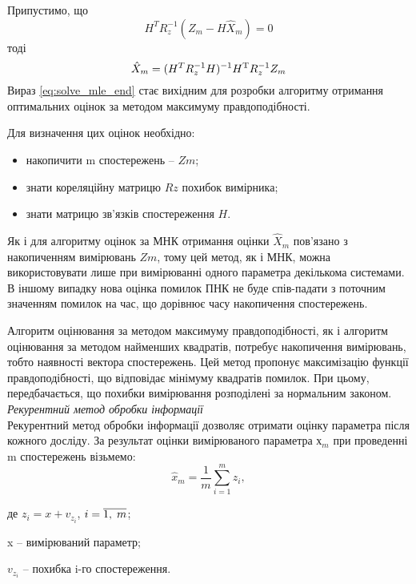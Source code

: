 Припустимо, що      
\[ H ^{T} R_{z}^{-1} (Z_{m} -H\hat{X}_{m} )=0 \]
тоді   
\begin{equation}
\hat{X }_{m} =(H^{T} R_{z}^{-1} H)^{-1} H^{{\rm T}} R_{z}^{-1} Z_{m} 
\label{eq:solve_mle_end}
\end{equation}
Вираз \eqref{eq:solve_mle_end} стає вихідним для розробки алгоритму отримання оптимальних 
оцінок  за методом максимуму правдоподібності.

Для визначення цих оцінок необхідно:
\begin{itemize}
\item накопичити m  спостережень -- $Zm$;
\item знати кореляційну матрицю $Rz$ похибок вимірника;
\item знати матрицю зв'язків спостереження $H$.
\end{itemize}

Як і для алгоритму оцінок за МНК отримання оцінки $\hat{X}_{m} $  пов'язано 
з накопиченням вимірювань $Zm$, тому цей метод, як і МНК, можна використовувати 
лише при вимірюванні одного параметра декількома системами. В іншому випадку нова 
оцінка помилок ПНК не буде спів-падати з поточним значенням помилок на час, що дорівнює 
часу накопичення спостережень.

Алгоритм оцінювання за методом максимуму правдоподібності, як і алгоритм оцінювання 
за методом найменших квадратів, потребує накопичення вимірювань, тобто наявності 
вектора спостережень. Цей метод пропонує максимізацію функції правдоподібності, що 
відповідає мінімуму квадратів помилок. При цьому, передбачається, що похибки вимірювання 
розподілені за нормальним законом.\\

\textit{Рекурентний метод обробки інформації } \\

Рекурентний метод обробки інформації дозволяє отримати оцінку параметра після кожного 
досліду. За результат оцінки вимірюваного параметра $х_m$ при проведенні m спостережень 
візьмемо:          
\[ \hat{x}_{m} =\frac{1}{m} \sum _{i=1}^{m}z_{i},\]
\begin{ESKDexplanation}
\item де $z_{i} =x+v_{z_{i}}$, $i=\overline{1,{\rm \; }m}$; 
\item x -- вимірюваний параметр; 
\item $v_{z_{i}}$ -- похибка i-го спостереження.
\end{ESKDexplanation}

